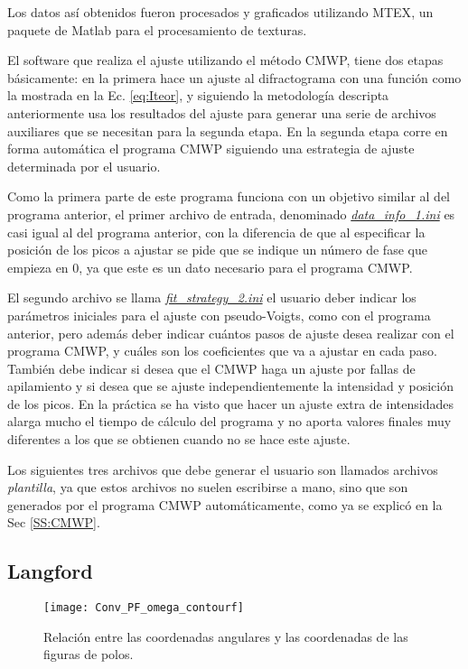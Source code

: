 Los datos así obtenidos fueron procesados y graficados utilizando MTEX\cite{Hielscher2008}, un paquete de Matlab para el procesamiento de texturas.

El software que realiza el ajuste utilizando el método CMWP, tiene dos etapas básicamente: en la primera hace un ajuste al difractograma con una función como la mostrada en la Ec. \ref{eq:Iteor}, y siguiendo la metodología descripta anteriormente usa los resultados del ajuste para generar una serie de archivos auxiliares que se necesitan para la segunda etapa.
En la segunda etapa corre en forma automática el programa CMWP siguiendo una estrategia de ajuste determinada por el usuario.

Como la primera parte de este programa funciona con un objetivo similar al del programa anterior, el primer archivo de entrada, denominado \hyperlink{dinfoCMWP}{\textit{data\_info\_1.ini}} es casi igual al del programa anterior, con la diferencia de que al especificar la posición de los picos a ajustar se pide que se indique un número de fase que empieza en 0, ya que este es un dato necesario para el programa CMWP.

El segundo archivo se llama \hyperlink{fitstrategy}{\textit{fit\_strategy\_2.ini}} el usuario deber indicar los parámetros iniciales para el ajuste con pseudo-Voigts, como con el programa anterior, pero además deber indicar cuántos pasos de ajuste desea realizar con el programa CMWP, y cuáles son los coeficientes que va a ajustar en cada paso.
También debe indicar si desea que el CMWP haga un ajuste por fallas de apilamiento  y si desea que se ajuste independientemente la intensidad y posición de los picos.
En la práctica se ha visto que hacer un ajuste extra de intensidades alarga mucho el tiempo de cálculo del programa y no aporta valores finales muy diferentes a los que se obtienen cuando no se hace este ajuste.

Los siguientes tres archivos que debe generar el usuario son llamados archivos \textit{plantilla}, ya que estos archivos no suelen escribirse a mano, sino que son generados por el programa CMWP automáticamente, como ya se explicó en la Sec \ref{SS:CMWP}.

\iffalse
\subsection{Langford}\label{SS:MLgfrd}

\begin{figure}[!htb]
  \centering
  \texttt{[image: Conv\_PF\_omega\_contourf]}
  \caption{Relación entre las coordenadas angulares y las coordenadas de las figuras de polos.}
  \label{fig:LabtoPF}
\end{figure}

